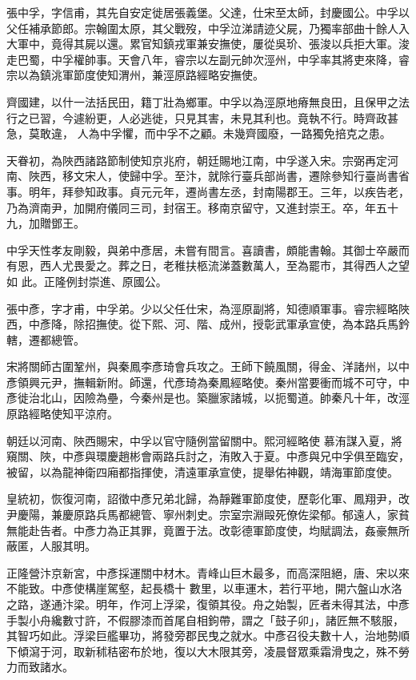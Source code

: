 \begin{pinyinscope}
 張中孚，字信甫，其先自安定徙居張義堡。父達，仕宋至太師，封慶國公。中孚以父任補承節郎。宗翰圍太原，其父戰歿，中孚泣涕請迹父屍，乃獨率部曲十餘人入大軍中，竟得其屍以還。累官知鎮戎軍兼安撫使，屢從吳玠、張浚以兵拒大軍。浚走巴蜀，中孚權帥事。天會八年，睿宗以左副元帥次涇州，中孚率其將吏來降，睿宗以為鎮洮軍節度使知渭州，兼涇原路經略安撫使。



 齊國建，以什一法括民田，籍丁壯為鄉軍。中孚以為涇原地瘠無良田，且保甲之法行之已習，今遽紛更，人必逃徙，只見其害，未見其利也。竟執不行。時齊政甚急，莫敢違，
 人為中孚懼，而中孚不之顧。未幾齊國廢，一路獨免掊克之患。



 天眷初，為陜西諸路節制使知京兆府，朝廷賜地江南，中孚遂入宋。宗弼再定河南、陜西，移文宋人，使歸中孚。至汴，就除行臺兵部尚書，遷除參知行臺尚書省事。明年，拜參知政事。貞元元年，遷尚書左丞，封南陽郡王。三年，以疾告老，乃為濟南尹，加開府儀同三司，封宿王。移南京留守，又進封崇王。卒，年五十九，加贈鄧王。



 中孚天性孝友剛毅，與弟中彥居，未嘗有間言。喜讀書，頗能書翰。其御士卒嚴而有恩，西人尤畏愛之。葬之日，老稚扶柩流涕蓋數萬人，至為罷市，其得西人之望如
 此。正隆例封崇進、原國公。



 張中彥，字才甫，中孚弟。少以父任仕宋，為涇原副將，知德順軍事。睿宗經略陜西，中彥降，除招撫使。從下熙、河、階、成州，授彰武軍承宣使，為本路兵馬鈐轄，遷都總管。



 宋將關師古圍鞏州，與秦鳳李彥琦會兵攻之。王師下饒風關，得金、洋諸州，以中彥領興元尹，撫輯新附。師還，代彥琦為秦鳳經略使。秦州當要衝而城不可守，中彥徙治北山，因險為壘，今秦州是也。築臘家諸城，以扼蜀道。帥秦凡十年，改涇原路經略使知平涼府。



 朝廷以河南、陜西賜宋，中孚以官守隨例當留關中。熙河經略使
 慕洧謀入夏，將窺關、陜，中彥與環慶趙彬會兩路兵討之，洧敗入于夏。中彥與兄中孚俱至臨安，被留，以為龍神衛四廂都指揮使，清遠軍承宣使，提舉佑神觀，靖海軍節度使。



 皇統初，恢復河南，詔徵中彥兄弟北歸，為靜難軍節度使，歷彰化軍、鳳翔尹，改尹慶陽，兼慶原路兵馬都總管、寧州刺史。宗室宗淵毆死僚佐梁郁。郁遠人，家貧無能赴告者。中彥力為正其罪，竟置于法。改彰德軍節度使，均賦調法，姦豪無所蔽匿，人服其明。



 正隆營汴京新宮，中彥採運關中材木。青峰山巨木最多，而高深阻絕，唐、宋以來不能致。中彥使構崖駕壑，起長橋十
 數里，以車運木，若行平地，開六盤山水洛之路，遂通汴梁。明年，作河上浮梁，復領其役。舟之始製，匠者未得其法，中彥手製小舟纔數寸許，不假膠漆而首尾自相鉤帶，謂之「鼓子卯」，諸匠無不駭服，其智巧如此。浮梁巨艦畢功，將發旁郡民曳之就水。中彥召役夫數十人，治地勢順下傾瀉于河，取新秫秸密布於地，復以大木限其旁，凌晨督眾乘霜滑曳之，殊不勞力而致諸水。




\end{pinyinscope}
